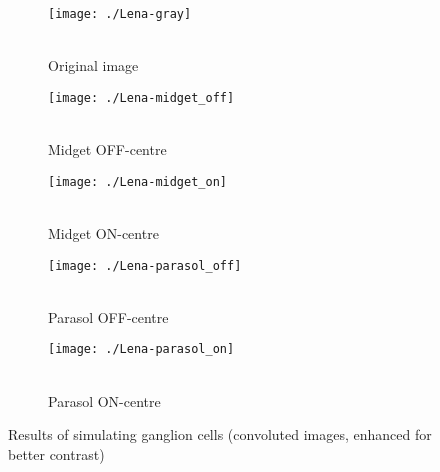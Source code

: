 \begin{figure}[hbt]
    \centering
    \begin{subfigure}[t]{0.15\textwidth}
        \centering
        \captionsetup{justification=centering,margin=0.1cm}
        \texttt{[image: ./Lena-gray]}
        \caption{\\Original image}
        \label{pic-lena}
    \end{subfigure}
    \begin{subfigure}[t]{0.15\textwidth}
        \centering
        \captionsetup{justification=centering,margin=0.1cm}
        \texttt{[image: ./Lena-midget\_off]}
        \caption{\\Midget OFF-centre}
        \label{pic-lena-M-OFF}
    \end{subfigure}
    \begin{subfigure}[t]{0.15\textwidth}
        \centering
        \captionsetup{justification=centering,margin=0.1cm}
        \texttt{[image: ./Lena-midget\_on]}
        \caption{\\Midget ON-centre}
        \label{pic-lena-M-ON}
    \end{subfigure}
    \begin{subfigure}[t]{0.15\textwidth}
        \centering
        \captionsetup{justification=centering,margin=0.1cm}
        \texttt{[image: ./Lena-parasol\_off]}
        \caption{\\Parasol OFF-centre}
        \label{pic-lena-P-OFF}
    \end{subfigure}
    \begin{subfigure}[t]{0.15\textwidth}
        \centering
        \captionsetup{justification=centering,margin=0.1cm}
        \texttt{[image: ./Lena-parasol\_on]}
        \caption{\\Parasol ON-centre}
        \label{pic-lena-P-ON}
    \end{subfigure}
    \caption{Results of simulating ganglion cells (convoluted images, enhanced for better contrast)}
\end{figure}

